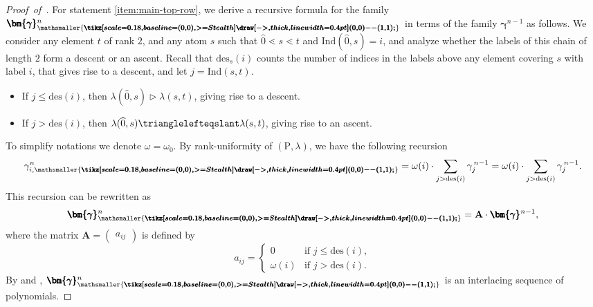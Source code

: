 \documentclass[11pt,a4paper]{amsart}
\theoremstyle{results}
\theoremstyle{definitions}
\def\P{\mathbb{P}}
\newcommand{\zero}{\hat{0}}
\newcommand{\des}{\mathrm{des}}
\newcommand{\Ind}{\mathrm{Ind}}
\renewcommand{\P}{\mathrm{P}}
\renewcommand{\hat}{\widehat}
\newcommand{\asce}{\mathsmaller{\pmb{\smallnearrow}}}
\newcommand{\smallnearrow}{\tikz[scale=0.18, baseline={(0, 0)}, >={Stealth}]\draw[->, thick, line width=0.4pt] (0, 0) -- (1,1);}
\begin{document}
\begin{proof}[Proof~of~]
For statement \ref{item:main-top-row}, we derive a recursive formula for the family $\pmb{\bm{\gamma}}^n_{\asce}$ in terms of the family $\pmb{\bm{\gamma}}^{n-1}$ as follows. We consider any element $t$ of rank $2$, and any atom $s$ such that $\zero \lessdot s \lessdot t$ and $\Ind(\zero, s) = i$, and analyze whether the labels of this chain of length $2$ form a descent or an ascent. Recall that $\des_{s}(i)$ counts the number of indices in the labels above any element covering $s$ with label $i$, that gives rise to a descent, and let $j = \Ind(s, t)$. 
\begin{itemize}
    \item If $j \leqslant \des(i)$, then $\lambda(\zero, s) \vartriangleright \lambda(s, t)$, giving rise to a descent.
    \item If $j > \des(i)$, then $\lambda(\zero, s) \trianglelefteqslant \lambda(s, t)$, giving rise to an ascent.
\end{itemize} 
To simplify notations we denote $\omega = \omega_{0}$. By rank-uniformity of $(\P, \lambda)$, we have the following recursion 
\[
\gamma^{n}_{i, \asce} = \omega(i) \cdot \sum_{j > \des(i)} \gamma^{\,n-1}_{j}
= \omega(i) \cdot \sum_{j > \des(i)} \gamma^{\,n-1}_{j}.
\]
This recursion can be rewritten as 
\[
\pmb{\bm{\gamma}} _{\asce}^{n} = \mathbf{A} \cdot \pmb{\bm{\gamma}}^{n-1}, 
\] where the matrix $\mathbf{A} = \begin{pmatrix} a_{ij}\end{pmatrix}$ is defined by  
\[
a_{ij} = \begin{cases}
    0 & \text{if $j \leqslant \des(i)$}, \\
    \omega(i) & \text{if $j > \des(i)$}.
\end{cases}
\]
By  and , $\pmb{\bm{\gamma}} _{\asce}^{n}$ is an interlacing sequence of polynomials. 
\smallskip


\end{proof}
\end{document}
